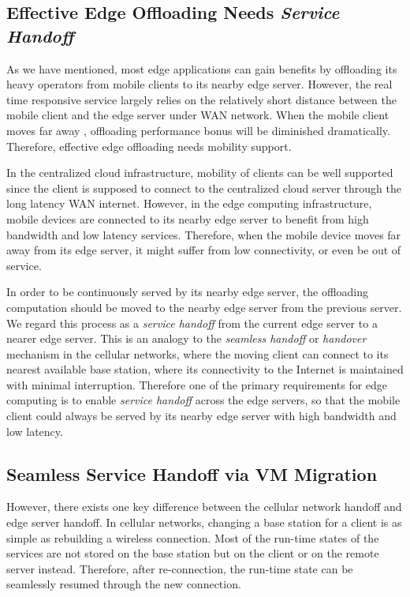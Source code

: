 \subsection{Effective Edge Offloading Needs \textit{Service Handoff}}

As we have mentioned, most edge applications can gain benefits by offloading its heavy operators from mobile clients to its nearby edge server. However, the real time responsive service largely relies on the relatively short distance between the mobile client and the edge server under WAN network. When the mobile client moves far away 
, offloading performance bonus will be diminished dramatically.
Therefore, effective edge offloading needs mobility support.

In the centralized cloud infrastructure, mobility of clients can be well supported since the client is supposed to connect to the centralized cloud server through the long latency WAN internet. However, in the edge computing infrastructure, mobile devices are connected to its nearby edge server to benefit from high bandwidth and low latency services. Therefore, when the mobile device moves far away from its edge server, it might suffer from low connectivity, or even be out of service. 

In order to be continuously served by its nearby edge server, the offloading computation should be moved to the nearby edge server from the previous server. We regard this process as a \textit{service  handoff} from the current edge server to a nearer edge server. 
This is an analogy to the \textit{seamless handoff} or \textit{handover}  mechanism in the cellular networks, where the moving client can connect to its nearest available base station, where its connectivity to the Internet is maintained with minimal interruption. 
%
Therefore one of the primary requirements for edge computing is to enable  \textit{service handoff} across the edge servers, so that the mobile client could always be served by its nearby edge server with high bandwidth and low latency.

\subsection{Seamless Service Handoff via VM Migration}

However, there exists one key difference between the cellular network handoff and edge server handoff.
%
In cellular networks, changing a base station for a client is as simple as rebuilding a wireless connection. Most of the run-time states of the services are not stored on the base station but on the client or on the remote server instead. Therefore, after re-connection, the run-time state can be seamlessly resumed through the new connection. 

